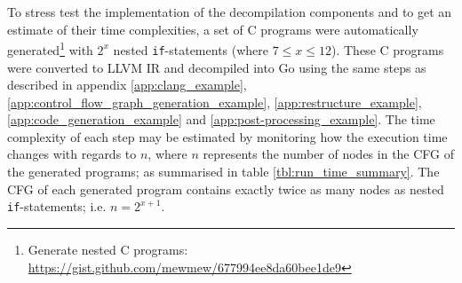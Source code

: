 To stress test the implementation of the decompilation components and to get an estimate of their time complexities, a set of C programs were automatically generated\footnote{Generate nested C programs: \url{https://gist.github.com/mewmew/677994ee8da60bee1de9}} with $ 2^{x} $ nested \texttt{if}-statements (where $ 7 \le x \le 12 $). These C programs were converted to LLVM IR and decompiled into Go using the same steps as described in appendix \ref{app:clang_example}, \ref{app:control_flow_graph_generation_example}, \ref{app:restructure_example}, \ref{app:code_generation_example} and \ref{app:post-processing_example}. The time complexity of each step may be estimated by monitoring how the execution time changes with regards to $ n $, where $ n $ represents the number of nodes in the CFG of the generated programs; as summarised in table \ref{tbl:run_time_summary}. The CFG of each generated program contains exactly twice as many nodes as nested \texttt{if}-statements; i.e. $ n = 2^{x+1} $.

